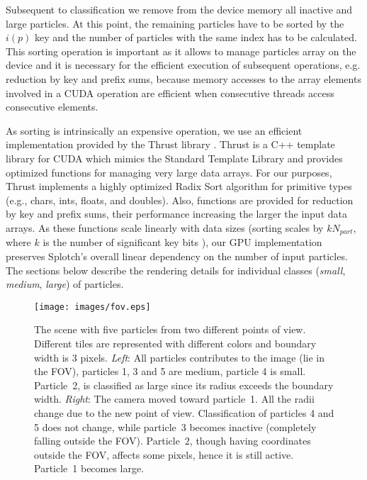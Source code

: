 \documentclass[1p]{elsarticle}
\begin{document}
Subsequent to classification we remove from the device memory all inactive and large particles. At this point, the remaining particles have to be sorted by the $i(p)$ key and the number of particles with the same index has to be calculated.
This sorting operation is important as it allows to manage particles array on the device and it is  
necessary for the efficient execution of subsequent operations, e.g. reduction by key and prefix sums, because memory accesses to the array elements involved in a CUDA operation are efficient when consecutive threads access consecutive elements.

As sorting is intrinsically an expensive operation, we use an efficient implementation provided by the Thrust library \cite{thrusturl}. Thrust is a C++ template library for CUDA which mimics the Standard Template Library and provides optimized functions for managing very large data arrays. For our purposes, Thrust implements a highly optimized Radix Sort algorithm for primitive types (e.g., chars, ints, floats, and doubles). Also, functions are provided for reduction by key and prefix sums, their performance increasing the larger the input data arrays. As these functions scale linearly with data sizes (sorting scales by $kN_{part}$, where $k$ is the number of significant key bits \cite{RadixSort}), our GPU implementation preserves Splotch's overall linear dependency on the number of input particles. The sections below describe the rendering details for individual classes ({\it small}, {\it medium}, {\it large}) of particles.

\begin{figure}
\centering
\texttt{[image: images/fov.eps]}
\caption{The scene with five particles from two different points of view. Different tiles are
represented with different colors and boundary width is 3 pixels. {\em Left}: All particles contributes to the image (lie in the FOV), particles 1, 3 and 5
are medium, particle 4 is small. Particle~2, is classified as large since its radius exceeds the boundary width. {\em Right}: The camera moved toward particle~1. All the radii change due to the new point
of view. Classification of particles 4 and 5 does not change, while particle~3
becomes inactive (completely falling outside the FOV). Particle~2, though
having coordinates outside the FOV, affects some pixels, hence it is still active.
Particle~1 becomes large.
}
\label{fig:fov}
\end{figure}
\end{document}
